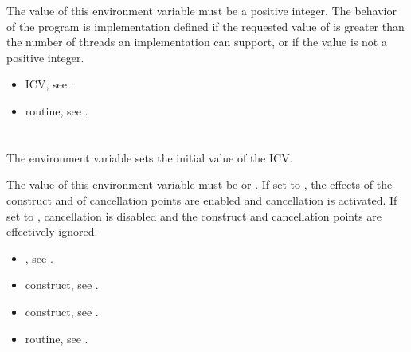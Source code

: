 The value of this environment variable must be a positive integer. The behavior of the
program is implementation defined if the requested value of  is
greater than the number of threads an implementation can support, or if the value is not
a positive integer.

\crossreferences
\begin{itemize}
\item {} ICV, see .

\item {} routine, see .
\end{itemize}









\section{}
\label{sec:OMP_CANCELLATION}
The  environment variable sets the initial value of the 
ICV.

The value of this environment variable must be  or . If set to , the
effects of the  construct and of cancellation points are enabled and cancellation
is activated. If set to , cancellation is disabled and the  construct and
cancellation points are effectively ignored.

\crossreferences
\begin{itemize}
\item {}, see .

\item {} construct, see .

\item {} construct, see .

\item {} routine, see .
\end{itemize}









